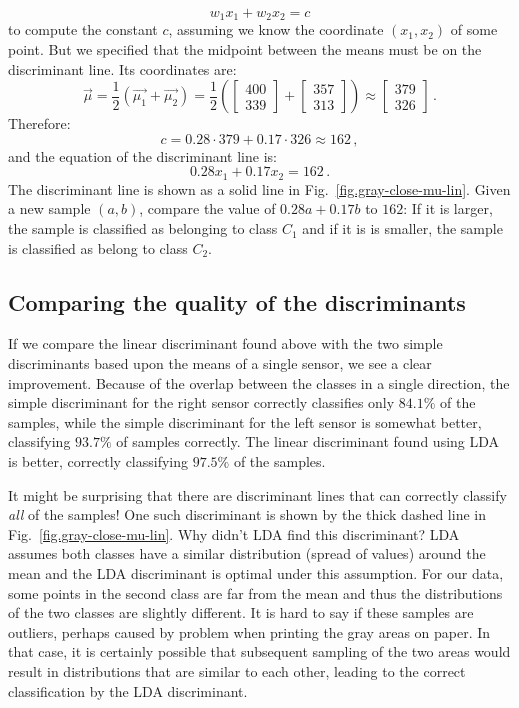 \[
w_1x_1 + w_2x_2 = c
\]
to compute the constant $c$, assuming we know the coordinate $(x_1,x_2)$ of some point. But we specified that the midpoint between the means must be on the discriminant line. Its coordinates are:
\[
\vec{\mu} = \frac{1}{2}(\vec{\mu_1} + \vec{\mu_2}) = \frac{1}{2}\left( \left[ \begin{array}{c} 400\\339 \end{array}\right] + \left[ \begin{array}{c} 357\\313 \end{array}\right] \right) \approx \left[ \begin{array}{c} 379\\326 \end{array}\right]\,.
\]
Therefore:
\[
c = 0.28 \cdot 379 + 0.17\cdot 326 \approx 162\,,
\]
and the equation of the discriminant line is:
\[
0.28 x_1 + 0.17 x_2 = 162\,.
\]
The discriminant line is shown as a solid line in Fig.~\ref{fig.gray-close-mu-lin}. Given a new sample $(a,b)$, compare the value of $0.28a + 0.17b$ to $162$: If it is larger, the sample is classified as belonging to class $C_1$ and if it is is smaller, the sample is classified as belong to class $C_2$. 

\subsection{Comparing the quality of the discriminants}

If we compare the linear discriminant found above with the two simple discriminants based upon the means of a single sensor, we see a clear improvement. Because of the overlap between the classes in a single direction, the simple discriminant for the right sensor correctly classifies only $84.1\%$ of the samples, while the simple discriminant for the left sensor is somewhat better, classifying $93.7\%$ of samples correctly. The linear discriminant found using LDA is better, correctly classifying $97.5\%$ of the samples.

It might be surprising that there are discriminant lines that can correctly classify \emph{all} of the samples! One such discriminant is shown by the thick dashed line in Fig.~\ref{fig.gray-close-mu-lin}. Why didn't LDA find this discriminant? LDA assumes both classes have a similar distribution (spread of values) around the mean and the LDA discriminant is optimal under this assumption. For our data, some points in the second class are far from the mean and thus the distributions of the two classes are slightly different. It is hard to say if these samples are outliers, perhaps caused by problem when printing the gray areas on paper. In that case, it is certainly possible that subsequent sampling of the two areas would result in distributions that are similar to each other, leading to the correct classification by the LDA discriminant.

